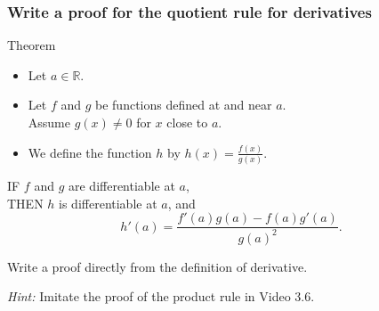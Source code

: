 \documentclass[14pt]{beamer}
\newcommand {\DS} [1] {${\displaystyle #1}$}
\newcommand {\R}{\mathbb{R}}
\newcommand{\setsize}[1]{\fontsize{#1}{#1}\selectfont} %
\newcommand{\smallerfont}{\setsize{13}} %
\begin{document}
\begin{frame}[t]
\smallerfont
\frametitle{Write a proof for the quotient rule for derivatives}

\begin{block}{Theorem}
\begin{itemize}
	\item Let $a \in \R$.
	\item  Let $f$ and $g$ be functions defined at and near $a$. \\
		Assume $g(x) \neq 0$ for $x$ close to $a$.
	\item  We define the function $h$ by  \DS{h(x) = \frac{f(x)}{g(x)}}.
\end{itemize}

IF $f$ and $g$ are differentiable at $a$, \\
THEN  $h$ is differentiable at $a$, and
	$$
		h'(a) =  \frac{f'(a) g(a) - f(a) g'(a)}{g(a)^2}.
	$$
\end{block}

\vfill


Write a proof directly from the definition of derivative.

\emph{Hint:} Imitate the proof of the product rule in  Video 3.6.

\end{frame}
\end{document}
